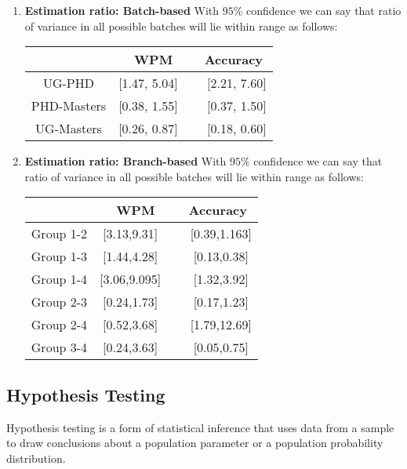 \documentclass[12pt,a4paper]{report}
\begin{document}
\begin{enumerate}[label=\textbf{\arabic*})]
\begin{enumerate}
        \item \textbf{Estimation ratio: Batch-based}
    With $95\%$ confidence we can say that ratio of variance in all possible batches will lie within range as follows:
    \begin{center}
    \begin{tabular}{ |c|c|c|}
      \hline
       & WPM & Accuracy \\
      \hline
      UG-PHD & [1.47, 5.04] \ & \ [2.21, 7.60] \\ 
      \hline
      PHD-Masters & [0.38, 1.55] \ & \ [0.37, 1.50] \\
      \hline
      UG-Masters & [0.26, 0.87] \ & \ [0.18, 0.60] \\
      \hline
    \end{tabular}
    \end{center}
    \vspace{2mm}
    
        \item \textbf{Estimation ratio: Branch-based}
    With $95\%$ confidence we can say that ratio of variance in all possible batches will lie within range as follows:
    \begin{center}
    \begin{tabular}{ |c|c|c|}
      \hline
       & WPM & Accuracy \\
      \hline
      Group 1-2 & [3.13,9.31] \ & \ [0.39,1.163] \\ 
      \hline
      Group 1-3 & [1.44,4.28] \ & \ [0.13,0.38] \\
      \hline
      Group 1-4 & [3.06,9.095] \ & \ [1.32,3.92] \\
      \hline
      Group 2-3 & [0.24,1.73] \ & \ [0.17,1.23]	\\
      \hline
      Group 2-4 & [0.52,3.68] \ & \ [1.79,12.69] \\
      \hline
      Group 3-4 & [0.24,3.63] \ & \ [0.05,0.75] \\
      \hline
    \end{tabular}
    \end{center}
    \vspace{1.5mm}
    \end{enumerate}
\end{enumerate}


\newpage
\subsection*{\LARGE{Hypothesis Testing}}
\label{sec:Hypothesis Testing}
Hypothesis testing is a form of statistical inference that uses data from a sample to draw conclusions about a population parameter or a population probability distribution.
\end{document}
